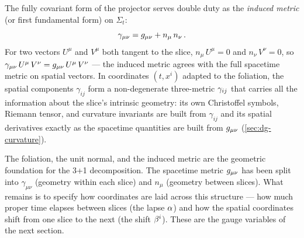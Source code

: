The fully covariant form of the projector serves double duty as the
\emph{induced metric} (or first fundamental form) on $\Sigma_t$:
%
\begin{equation}
  \gamma_{\mu\nu} = g_{\mu\nu} + n_\mu\,n_\nu \,.
  \label{eq:adm-induced-metric}
\end{equation}
%
For two vectors $U^\mu$ and $V^\mu$ both tangent to the slice,
$n_\mu\,U^\mu = 0$ and $n_\nu\,V^\nu = 0$, so
$\gamma_{\mu\nu}\,U^\mu\,V^\nu = g_{\mu\nu}\,U^\mu\,V^\nu$ --- the induced
metric agrees with the full spacetime metric on spatial vectors.
In coordinates $(t, x^i)$ adapted to the foliation, the spatial components
$\gamma_{ij}$ form a non-degenerate three-metric $\gamma_{ij}$ that
carries
all the information about the slice's intrinsic geometry: its own
Christoffel symbols, Riemann tensor, and curvature invariants are built
from $\gamma_{ij}$ and its spatial derivatives exactly as the spacetime
quantities are built from $g_{\mu\nu}$ (\cref{sec:dg-curvature}).

The foliation, the unit normal, and the induced metric are the geometric
foundation for the 3+1 decomposition.  The spacetime metric $g_{\mu\nu}$ has
been split into $\gamma_{\mu\nu}$ (geometry within each slice) and $n_\mu$
(geometry between slices).  What remains is to specify how coordinates are
laid across this structure --- how much proper time elapses between slices
(the lapse $\alpha$) and how the spatial coordinates shift from one slice
to the next (the shift $\beta^{i}$).  These are the gauge variables of the
next section.
